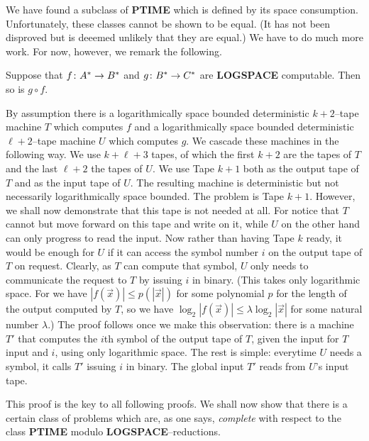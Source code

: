 We have found a subclass of \textbf{PTIME} which is defined by its space 
consumption. Unfortunately, these classes cannot be shown to be equal. 
(It has not been disproved but is deeemed unlikely that they are equal.) 
We have to do much more work. For now, however, we remark the following.
\begin{thm}
Suppose that $f \colon A^{\ast} \rightarrow B^{\ast}$ and
$g \colon B^{\ast} \rightarrow C^{\ast}$ are \textbf{LOGSPACE} computable.
Then so is $g \circ f$.
\end{thm}
\proofbeg
By assumption there is a logarithmically space bounded
deterministic $k+2$--tape machine $T$ which computes $f$ and a
logarithmically space bounded deterministic $\ell + 2$--tape
machine $U$ which computes $g$. We cascade these machines in
the following way. We use $k + \ell + 3$ tapes, of which the
first $k+2$ are the tapes of $T$ and the last $\ell +2$ the
tapes of $U$. We use Tape $k + 1$ both as the output tape of 
$T$ and as the input tape of $U$. The resulting machine is 
deterministic but not necessarily logarithmically space bounded. 
The problem is Tape $k+1$. However, we shall now demonstrate that 
this tape is not needed at all. For notice that $T$ cannot but move 
forward on this tape and write on it, while $U$ on the other hand 
can only progress to read the input. Now rather than having Tape $k$ 
ready, it would be enough for $U$ if it can access the symbol number $i$ on 
the output tape of $T$ on request. Clearly, as $T$ can compute that 
symbol, $U$ only needs to communicate the request to $T$ by issuing 
$i$ in binary. (This takes only logarithmic space. For we have 
$|f(\vec{x})| \leq p(|\vec{x}|)$ for some polynomial $p$
for the length of the output computed by $T$, so we have
$\log_2 |f(\vec{x})| \leq \lambda \log_2 |\vec{x}|$ for some
natural number $\lambda$.) The proof follows once we make this 
observation: there is a machine $T'$ that computes the $i$th 
symbol of the output tape of $T$, given the input for $T$ input 
and $i$, using only logarithmic space. The rest is simple: everytime 
$U$ needs a symbol, it calls $T'$ issuing $i$ in binary. The global 
input $T'$ reads from $U$'s input tape.
\proofend

This proof is the key to all following proofs. We shall now show
that there is a certain class of problems which are, as one says,
{\it complete\/} with respect to the class {\bf PTIME} modulo {\bf
LOGSPACE}--reductions. 

